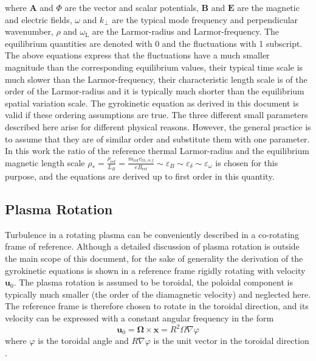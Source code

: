 \documentclass[a4paper,10pt]{article}
\newcommand{\st}[1]{\mathrm{#1}} %
\renewcommand{\vec}[1]{\mathbf{#1}}
\begin{document}
where $\vec{A}$ and $\Phi$ are the vector and scalar potentials, $\vec{B}$ and $\vec{E}$ are the magnetic and electric fields, $\omega$ and $k_{\perp}$ are the typical mode frequency and perpendicular wavenumber, $\rho$ and $\omega_{\st{L}}$ are the Larmor-radius and Larmor-frequency. The equilibrium quantities are denoted with 0 and the fluctuations with 1 subscript. The above equations express that the fluctuations have a much smaller magnitude than the corresponding equilibrium values, their typical time scale is much slower than the Larmor-frequency, their characteristic length scale is of the order of the Larmor-radius and it is typically much shorter than the equilibrium spatial variation scale. The gyrokinetic equation as derived in this document is valid if these ordering assumptions are true. The three different small parameters described here arise for different physical reasons. However, the general practice is to assume that they are of similar order and substitute them with one parameter. In this work the ratio of the reference thermal Larmor-radius and the equilibrium magnetic length scale $\rho_* = \frac{\rho_{\st{ref}}}{L_B} = \frac{m_{\st{ref}} v_{th,ref}}{e B_{\st{ref}}} \sim \varepsilon_B \sim \varepsilon_{\delta} \sim \varepsilon_{\omega}$ is chosen for this purpose, and the equations are derived up to first order in this quantity. 

\subsection{Plasma Rotation} \label{sec:rotation}
Turbulence in a rotating plasma can be conveniently described in a co-rotating
frame of reference. Although a detailed discussion of plasma rotation is outside
the main scope of this document, for the sake of generality the derivation of
the gyrokinetic equations is shown in a reference frame rigidly rotating with
velocity $\vec{u}_0$. The plasma rotation is assumed to be toroidal, the
poloidal component is typically much smaller (the order of the diamagnetic velocity) and neglected here. The reference frame is therefore chosen to rotate in the toroidal direction, and its velocity can be expressed with a constant angular frequency in the form
\begin{equation}
\vec{u}_0 = \vec{\Omega} \times \vec{x} = R^2 \Omega \nabla \varphi
\label{eq:frame_frequency}
\end{equation}
where $\varphi$ is the toroidal angle and $R \nabla \varphi$ is the unit vector in the toroidal direction \cite{peeters_rotation}. 
\end{document}
